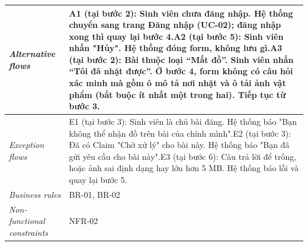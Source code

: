 \begin{longtable}[]{@{}|>{\raggedright\arraybackslash}p{}|>{\raggedright\arraybackslash}p{}|@{}}
\emph{Alternative flows} & A1 (tại bước 2): Sinh viên chưa đăng nhập. Hệ thống chuyển sang trang Đăng nhập (UC-02); đăng nhập xong thì quay lại bước 4.\newline A2 (tại bước 5): Sinh viên nhấn "Hủy". Hệ thống đóng form, không lưu gì.\newline A3 (tại bước 2): Bài thuộc loại “Mất đồ”. Sinh viên nhấn “Tôi đã nhặt được”. Ở bước 4, form không có câu hỏi xác minh mà gồm ô mô tả nơi nhặt và ô tải ảnh vật phẩm (bắt buộc ít nhất một trong hai). Tiếp tục từ bước 3. \\ \hline
\emph{Exception flows} & E1 (tại bước 3): Sinh viên là chủ bài đăng. Hệ thống báo "Bạn không thể nhận đồ trên bài của chính mình".\newline E2 (tại bước 3): Đã có Claim "Chờ xử lý" cho bài này. Hệ thống báo "Bạn đã gửi yêu cầu cho bài này".\newline E3 (tại bước 6): Câu trả lời để trống, hoặc ảnh sai định dạng hay lớn hơn 5 MB. Hệ thống báo lỗi và quay lại bước 5. \\ \hline
\emph{Business rules} & BR-01, BR-02 \\ \hline
\emph{Non-functional constraints} & NFR-02 \\ \hline
\end{longtable}
